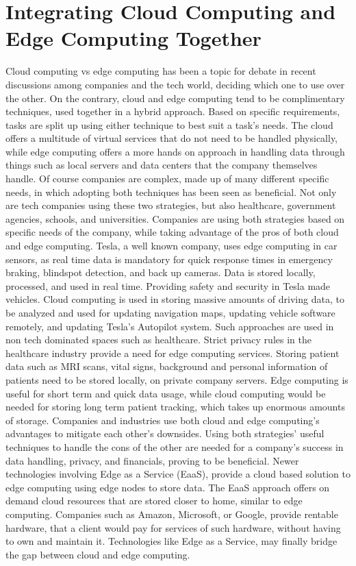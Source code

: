 \documentclass[conference]{IEEEtran}
\begin{document}
{\section{Integrating Cloud Computing and Edge Computing Together}
Cloud computing vs edge computing has been a topic for debate in recent discussions among companies and the tech world, deciding which one to use over the other. On the contrary, cloud and edge computing tend to be complimentary techniques, used together in a hybrid approach. Based on specific requirements, tasks are split up using either technique to best suit a task's needs. The cloud offers a multitude of virtual services that do not need to be handled physically, while edge computing offers a more hands on approach in handling data through things such as local servers and data centers that the company themselves handle. Of course companies are complex, made up of many different specific needs, in which adopting both techniques has been seen as beneficial. Not only are tech companies using these two strategies, but also healthcare, government agencies, schools, and universities. 
Companies are using both strategies based on specific needs of the company, while taking advantage of the pros of both cloud and edge computing. Tesla, a well known company, uses edge computing in car sensors, as real time data is mandatory for quick response times in emergency braking, blindspot detection, and back up cameras. Data is stored locally, processed, and used in real time. Providing safety and security in Tesla made vehicles. Cloud computing is used in storing massive amounts of driving data, to be analyzed and used for updating navigation maps, updating vehicle software remotely, and updating Tesla’s Autopilot system. 
Such approaches are used in non tech dominated spaces such as healthcare. Strict privacy rules in the healthcare industry provide a need for edge computing services. Storing patient data such as MRI scans, vital signs, background and personal information of patients need to be stored locally, on private company servers. Edge computing is useful for short term and quick data usage, while cloud computing would be needed for storing long term patient tracking, which takes up enormous amounts of storage. 
Companies and industries use both cloud and edge computing’s advantages to mitigate each other's downsides. Using both strategies’ useful techniques to handle the cons of the other are needed for a company's success in data handling, privacy, and financials, proving to be beneficial. Newer technologies involving Edge as a Service (EaaS), provide a cloud based solution to edge computing using edge nodes to store data. The EaaS approach offers on demand cloud resources that are stored closer to home, similar to edge computing. Companies such as Amazon, Microsoft, or Google, provide rentable hardware, that a client would pay for services of such hardware, without having to own and maintain it. Technologies like Edge as a Service, may finally bridge the gap between cloud and edge computing.

}
\end{document}
